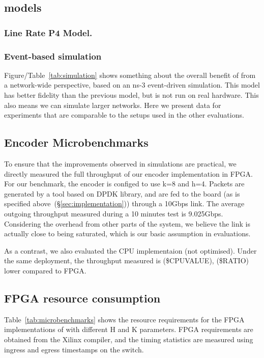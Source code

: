 \subsection{\OurSys models}

\subsubsection{Line Rate P4 Model.} 




\subsubsection{Event-based simulation}
Figure/Table~\ref{tab:simulation} shows something about the overall benefit of \OurSys from a network-wide perspective, based on an ns-3 event-driven simulation.
This model has better fidelity than the previous model, but is not run on real hardware. This also means we can simulate larger networks. Here we present data for experiments that are comparable to the setups used in the other evaluations.


\subsection{Encoder Microbenchmarks}

To ensure that the improvements observed in simulations are practical, we directly measured the 
full throughput of our encoder implementation in FPGA. For our benchmark, the encoder is configed to use
k=8 and h=4. Packets are generated by a tool based
on DPDK library, and are fed to the board (as is specified above~(\S\ref{sec:implementation})) through
a 10Gbps link. The average outgoing throughput measured during a 10 minutes test is 9.025Gbps.
Considering the overhead from other parts of the system, we believe the link is actually close
to being saturated, which is our basic assumption in evaluations.

As a contrast, we also evaluated the CPU implementaion (not optimised). Under the same deployment, the throughput measured is 
(\$CPUVALUE), (\$RATIO) lower compared to FPGA.



\subsection{FPGA resource consumption}
Table~\ref{tab:microbenchmarks} shows the resource requirements for the FPGA implementations of
\OurSys with different H and K parameters.
FPGA requirements are obtained from the Xilinx compiler, and the
timing statistics are measured using ingress and egress timestamps on
the switch.


